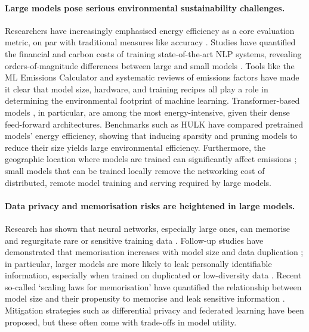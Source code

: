 \paragraph{Large models pose serious environmental sustainability challenges.} Researchers have increasingly emphasised energy efficiency as a core evaluation metric, on par with traditional measures like accuracy \citep{schwartz2020greenai}. Studies have quantified the financial and carbon costs of training state-of-the-art NLP systems, revealing orders-of-magnitude differences between large and small models \citep{strubell2019energy}. Tools like the ML Emissions Calculator \citep{lacoste2019quantifying} and systematic reviews of emissions factors \citep{luccioni2023counting} have made it clear that model size, hardware, and training recipes all play a role in determining the environmental footprint of machine learning. Transformer-based models \citep{vaswani2017attention}, in particular, are among the most energy-intensive, given their dense feed-forward architectures. Benchmarks such as HULK \citep{zhou2021hulk} have compared pretrained models' energy efficiency, showing that inducing sparsity and pruning models to reduce their size yields large environmental efficiency. Furthermore, the geographic location where models are trained can significantly affect emissions \citep{patterson2021carbon}; small models that can be trained locally remove the networking cost of distributed, remote model training and serving required by large models. 


\paragraph{Data privacy and memorisation risks are heightened in large models.} Research has shown that neural networks, especially large ones, can memorise and regurgitate rare or sensitive training data \citep{feldman2020neural, carlini2019secret}. Follow-up studies have demonstrated that memorisation increases with model size and data duplication \citep{carlini2021extracting, carlini2022quantifying}; in particular, larger models are more likely to leak personally identifiable information, especially when trained on duplicated or low-diversity data \citep{huang2022large, neel2023privacy}. Recent so-called `scaling laws for memorisation' have quantified the relationship between model size and their propensity to memorise and leak sensitive information \citep{lu2024scaling, biderman2023emergent, kiyomaru2024comprehensive}. Mitigation strategies such as differential privacy \citep{dwork2006calibrating} and federated learning \citep{mcmahan2017communication} have been proposed, but these often come with trade-offs in model utility.%

